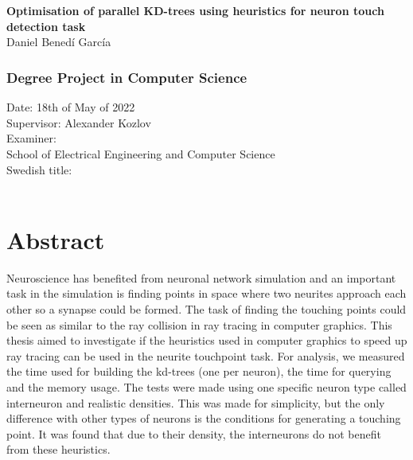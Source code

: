 \newpage
\thispagestyle{plain}
~\\
\begin{minipage}[b]{0.25\textwidth}
~\\
\end{minipage}
\begin{minipage}{0.65\textwidth}
\begin{flushleft}
{\fontsize{28}{24}\bf\sffamily Optimisation of parallel KD-trees using heuristics for neuron touch detection task\\}
\vspace{3cm}
{\fontsize{16}{18}\sffamily Daniel Benedí García}\\
\end{flushleft}
\end{minipage}
\vfill
{ 
	\subsection*{Degree Project in Computer Science}
	Date: 18th of May of 2022\\
	Supervisor: Alexander Kozlov \\
	Examiner: \\
	School of Electrical Engineering and Computer Science \\
	Swedish title: \\
	~
}


\newpage
\thispagestyle{plain}
\chapter*{Abstract}
Neuroscience has benefited from neuronal network simulation and an important task in the simulation is finding points in space where two neurites approach each other so a synapse could be formed. The task of finding the touching points could be seen as similar to the ray collision in ray tracing in computer graphics. This thesis aimed to investigate if the heuristics used in computer graphics to speed up ray tracing can be used in the neurite touchpoint task. For analysis, we measured the time used for building the kd-trees (one per neuron), the time for querying and the memory usage. The tests were made using one specific neuron type called interneuron and realistic densities. This was made for simplicity, but the only difference with other types of neurons is the conditions for generating a touching point. It was found that due to their density, the interneurons do not benefit from these heuristics.


